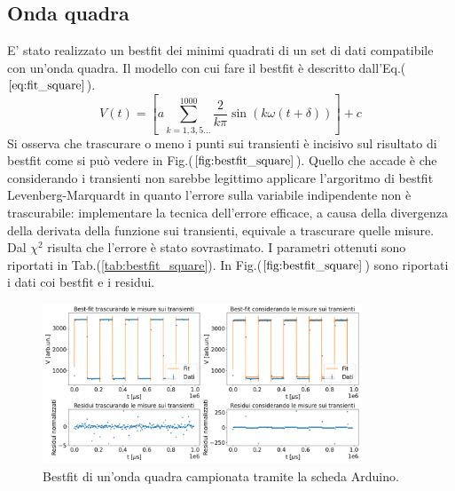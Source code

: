 \documentclass{article}
\begin{document}
    \subsection{Onda quadra}
            \label{sez:bestfit_quadra}
            E' stato realizzato un bestfit dei minimi quadrati
            di un set di dati compatibile con un'onda quadra.
            Il modello con cui fare il bestfit è descritto dall'Eq.($\ref{eq:fit_square}$).
                \begin{equation}
                    V(t) = \left[a\sum_{k=1,3,5...}^{1000} \frac{2}{k\pi}\sin\left(k\omega (t+\delta)\right)\right] +c
                    \label{eq:fit_square}
                \end{equation}
            Si osserva che trascurare o meno i punti sui transienti è incisivo
            sul risultato di bestfit come si può vedere in Fig.($\ref{fig:bestfit_square}$).
            Quello che accade è che considerando i transienti non sarebbe legittimo
            applicare l'argoritmo di bestfit Levenberg-Marquardt in quanto l'errore 
            sulla variabile indipendente non è trascurabile: implementare la  tecnica 
            dell'errore efficace, a causa della divergenza della derivata della funzione sui transienti,
            equivale a trascurare quelle misure.
            Dal $\chi^2$ risulta che l'errore è stato sovrastimato. 
            I parametri ottenuti sono riportati in Tab.(\ref{tab:bestfit_square}).
            In Fig.($\ref{fig:bestfit_square}$) sono riportati i dati coi bestfit e 
            i residui.
            

            \begin{figure}[H]
                \centering
                \includegraphics[width=0.85\textwidth]{bestfit_squarewave.png} %
                \caption{Bestfit di un'onda quadra campionata tramite la scheda Arduino.}
                \label{fig:bestfit_square}
            \end{figure}     
            
\end{document}
